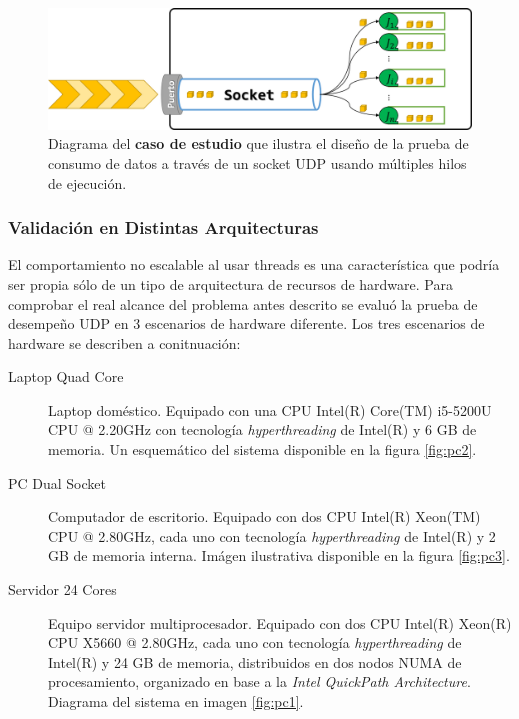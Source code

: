 \begin{figure}[!h]
	\centering
	\includegraphics[scale=0.5]{imagenes/casoDeEstudio.png}
	\caption{Diagrama del \textbf{caso de estudio} que ilustra el diseño de la prueba de consumo de datos a través de un socket UDP usando múltiples hilos de ejecución.}
	\label{fig:testUDP}
\end{figure}

\subsubsection{Validación en Distintas Arquitecturas}

El comportamiento no escalable al usar threads es una característica que podría ser propia sólo de un tipo de arquitectura de recursos de hardware. Para comprobar el real alcance del problema antes descrito se evaluó la prueba de desempeño UDP en 3 escenarios de hardware diferente. Los tres escenarios de hardware se describen a conitnuación:

\begin{description}
\item[Laptop Quad Core] Laptop doméstico. Equipado con una CPU Intel(R) Core(TM) i5-5200U CPU @ 2.20GHz con tecnología \emph{hyperthreading} de Intel(R) y 6 GB de memoria. Un esquemático del sistema disponible en la figura \ref{fig:pc2}.
\item[PC Dual Socket] Computador de escritorio. Equipado con dos CPU Intel(R) Xeon(TM) CPU @ 2.80GHz, cada uno con tecnología \emph{hyperthreading} de Intel(R) y 2 GB de memoria interna. Imágen ilustrativa disponible en la figura \ref{fig:pc3}.
\item[Servidor 24 Cores] Equipo servidor multiprocesador. Equipado con dos CPU Intel(R) Xeon(R) CPU X5660 @ 2.80GHz, cada uno con tecnología \emph{hyperthreading} de Intel(R) y 24 GB de memoria, distribuidos en dos nodos NUMA de procesamiento, organizado en base a la \emph{Intel QuickPath Architecture}. Diagrama del sistema en imagen \ref{fig:pc1}.
\end{description}

